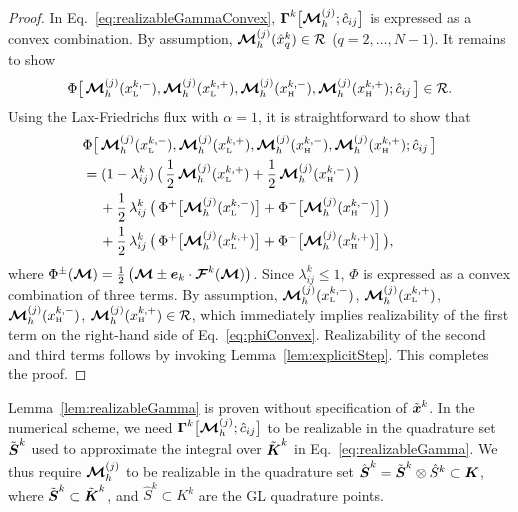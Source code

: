 \begin{proof}
  In Eq.~\eqref{eq:realizableGammaConvex}, $\boldsymbol{\Gamma}^{k}\big[\boldsymbol{\mathcal{M}}_{h}^{(j)};\hat{c}_{ij}\big]$ is expressed as a convex combination.  
  By assumption, $\boldsymbol{\mathcal{M}}_{h}^{(j)}(\hat{x}_{q}^{k})\in\mathcal{R}$ ($q=2,\ldots,N-1$).  
  It remains to show 
  \begin{equation*}
    \Phi\big[\,\boldsymbol{\mathcal{M}}_{h}^{(j)}(x_{\mbox{\tiny L}}^{k,-}),\boldsymbol{\mathcal{M}}_{h}^{(j)}(x_{\mbox{\tiny L}}^{k,+}),\boldsymbol{\mathcal{M}}_{h}^{(j)}(x_{\mbox{\tiny H}}^{k,-}),\boldsymbol{\mathcal{M}}_{h}^{(j)}(x_{\mbox{\tiny H}}^{k,+});\hat{c}_{ij}\,\big]\in\mathcal{R}.  
  \end{equation*}
  Using the Lax-Friedrichs flux with $\alpha=1$, it is straightforward to show that
  \begin{align}
    &\Phi\big[\,\boldsymbol{\mathcal{M}}_{h}^{(j)}(x_{\mbox{\tiny L}}^{k,-}),\boldsymbol{\mathcal{M}}_{h}^{(j)}(x_{\mbox{\tiny L}}^{k,+}),\boldsymbol{\mathcal{M}}_{h}^{(j)}(x_{\mbox{\tiny H}}^{k,-}),\boldsymbol{\mathcal{M}}_{h}^{(j)}(x_{\mbox{\tiny H}}^{k,+});\hat{c}_{ij}\,\big] \nonumber \\
    &=(1-\lambda_{ij}^{k})\,\big(\,\frac{1}{2}\,\boldsymbol{\mathcal{M}}_{h}^{(j)}(x_{\mbox{\tiny L}}^{k,+})+\frac{1}{2}\,\boldsymbol{\mathcal{M}}_{h}^{(j)}(x_{\mbox{\tiny H}}^{k,-})\,\big) \nonumber \\
    &\hspace{12pt}
    +\frac{1}{2}\,\lambda_{ij}^{k}\,\big(\,\Phi^{+}\big[\boldsymbol{\mathcal{M}}_{h}^{(j)}(x_{\mbox{\tiny L}}^{k,-})\big]+\Phi^{-}\big[\boldsymbol{\mathcal{M}}_{h}^{(j)}(x_{\mbox{\tiny H}}^{k,-})\big]\,\big) \nonumber \\
    &\hspace{12pt}
    +\frac{1}{2}\,\lambda_{ij}^{k}\,\big(\,\Phi^{+}\big[\boldsymbol{\mathcal{M}}_{h}^{(j)}(x_{\mbox{\tiny L}}^{k,+})\big]+\Phi^{-}\big[\boldsymbol{\mathcal{M}}_{h}^{(j)}(x_{\mbox{\tiny H}}^{k,+})\big]\,\big),
    \label{eq:phiConvex}
  \end{align}
  where $\Phi^{\pm}(\boldsymbol{\mathcal{M}})=\frac{1}{2}\,\big(\boldsymbol{\mathcal{M}}\pm\boldsymbol{e}_{k}\cdot\boldsymbol{\mathcal{F}}^{k}(\boldsymbol{\mathcal{M}})\big)$.  
  Since $\lambda_{ij}^{k}\le1$, $\Phi$ is expressed as a convex combination of three terms.  
  By assumption, $\boldsymbol{\mathcal{M}}_{h}^{(j)}(x_{\mbox{\tiny L}}^{k,-})$, $\boldsymbol{\mathcal{M}}_{h}^{(j)}(x_{\mbox{\tiny L}}^{k,+})$, $\boldsymbol{\mathcal{M}}_{h}^{(j)}(x_{\mbox{\tiny H}}^{k,-})$, $\boldsymbol{\mathcal{M}}_{h}^{(j)}(x_{\mbox{\tiny H}}^{k,+})\in\mathcal{R}$, which immediately implies realizability of the first term on the right-hand side of Eq.~\eqref{eq:phiConvex}.  
  Realizability of the second and third terms follows by invoking Lemma~\ref{lem:explicitStep}.  
  This completes the proof.  
\end{proof}

\begin{rem}
  Lemma~\eqref{lem:realizableGamma} is proven without specification of $\tilde{\boldsymbol{x}}^{k}$.  
  In the numerical scheme, we need $\boldsymbol{\Gamma}^{k}\big[\boldsymbol{\mathcal{M}}_{h}^{(j)};\hat{c}_{ij}\big]$ to be realizable in the quadrature set $\tilde{\boldsymbol{S}}^{k}$ used to approximate the integral over $\tilde{\boldsymbol{K}}^{k}$ in Eq.~\eqref{eq:realizableGamma}.  
  We thus require $\boldsymbol{\mathcal{M}}_{h}^{(j)}$ to be realizable in the quadrature set $\hat{\boldsymbol{S}}^{k}=\tilde{\boldsymbol{S}}^{k}\otimes\hat{S}^{k}\subset\boldsymbol{K}$, where $\tilde{\boldsymbol{S}}^{k}\subset\tilde{\boldsymbol{K}}^{k}$, and $\hat{S}^{k}\subset K^{k}$ are the GL quadrature points.  
\end{rem}

